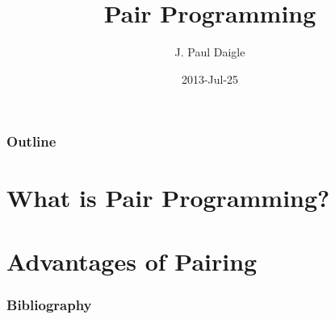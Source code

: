 

\title[] %
{Pair Programming}

\subtitle
{} %

\author[] %
{J. Paul Daigle }



\date[] %
{2013-Jul-25}

\subject{}














\begin{frame}
  \titlepage
\end{frame}

\begin{frame}
  \frametitle{Outline}
  \tableofcontents
\end{frame}


\section{What is Pair Programming?}

\section{Advantages of Pairing}

\begin{frame}[allowframebreaks]
  \frametitle{Bibliography}
  
\end{frame}



